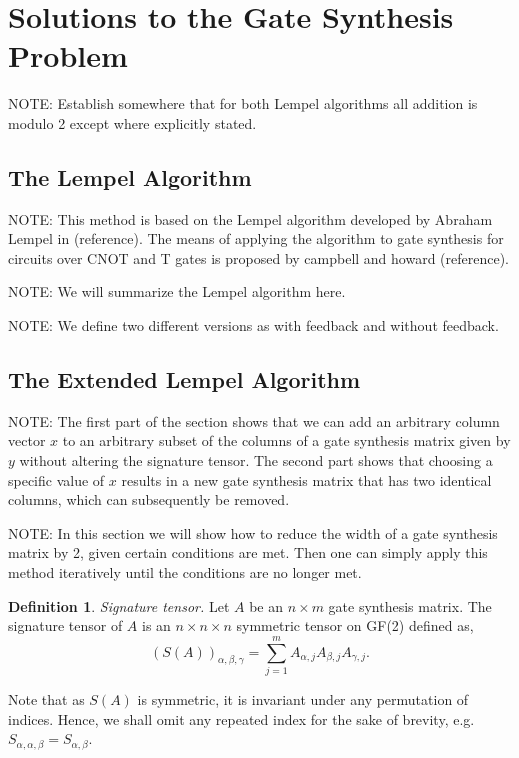 \documentclass{article}
\theoremstyle{definition}
\newtheorem{definition}{Definition}[section]
\theoremstyle{problem}
\theoremstyle{lemma}
\begin{document}
	\section{Solutions to the Gate Synthesis Problem}
	\label{s4_Solution}
		NOTE: Establish somewhere that for both Lempel algorithms all addition is modulo 2 except where explicitly stated.
	
		\subsection{The Lempel Algorithm}
		NOTE: This method is based on the Lempel algorithm developed by Abraham Lempel in (reference). The means of applying the algorithm to gate synthesis for circuits over CNOT and T gates is proposed by campbell and howard (reference).
		
		NOTE: We will summarize the Lempel algorithm here.
		
		NOTE: We define two different versions as with feedback and without feedback.
		
		\subsection{The Extended Lempel Algorithm}
		NOTE: The first part of the section shows that we can add an arbitrary column vector $x$ to an arbitrary subset of the columns of a gate synthesis matrix given by $y$ without altering the signature tensor. The second part shows that choosing a specific value of $x$ results in a new gate synthesis matrix that has two identical columns, which can subsequently be removed.
		
		NOTE: In this section we will show how to reduce the width of a gate synthesis matrix by 2, given certain conditions are met. Then one can simply apply this method iteratively until the conditions are no longer met.		
		
		
		\theoremstyle{definition}
		\begin{definition}{\emph{Signature tensor.}}
			Let $A$ be an $n \times m$ gate synthesis matrix. The signature tensor of $A$ is an $n \times n \times n$ symmetric tensor on GF(2) defined as,
			\begin{equation}
			\label{e_Sig}
			\left(S(A)\right)_{\alpha,\beta,\gamma} = \sum_{j = 1}^{m}A_{\alpha,j}A_{\beta,j}A_{\gamma,j}.
			\end{equation}
		\end{definition}
	
		Note that as $S(A)$ is symmetric, it is invariant under any permutation of indices. Hence, we shall omit any repeated index for the sake of brevity, e.g. $S_{\alpha, \alpha, \beta} = S_{\alpha,\beta}$.
		
\end{document}

